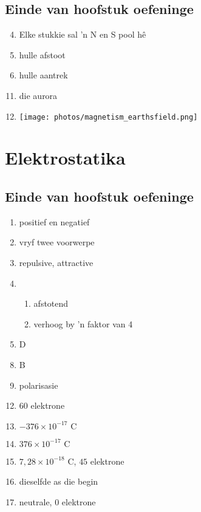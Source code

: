\subsection{Einde van hoofstuk oefeninge}
\begin{multicols}{2}
 \begin{enumerate}[noitemsep, label=\textbf{(\arabic*)} ]
\setcounter{enumi}{3}
\item Elke stukkie sal 'n N en S pool h\^{e} 
\item hulle afstoot
\item hulle aantrek
\end{enumerate}
 \begin{enumerate}[noitemsep, label=\textbf{(\arabic*)} ]
\setcounter{enumi}{10}
\item die aurora
\item \texttt{[image: photos/magnetism\_earthsfield.png]}
 \end{enumerate}
\end{multicols}

\section{Elektrostatika}
\subsection{Einde van hoofstuk oefeninge}
\begin{multicols}{3}
 \begin{enumerate}[noitemsep, label=\textbf{(\arabic*)} ]
\item positief en negatief
\item vryf twee voorwerpe
\item repulsive, attractive
\item 
 \begin{enumerate}[noitemsep, label=\textbf{(\alph*)} ]
\item afstotend
\item verhoog by 'n faktor van 4
 \end{enumerate}
\item D
 \end{enumerate}
\begin{enumerate}[noitemsep, label=\textbf{(\arabic*)} ]
\setcounter{enumi}{7}
 \item B
\item polarisasie
\end{enumerate}
\begin{enumerate}[noitemsep, label=\textbf{(\arabic*)} ]
\setcounter{enumi}{11}
 \item $60$ elektrone
\item $-376 \times 10^{-17} \text{ C}$
\item $376 \times 10^{-17} \text{ C}$
\item $7,28 \times 10^{-18} \text{ C}$, $45$ elektrone
\item dieselfde as die begin
\item neutrale, $0$ elektrone
\end{enumerate}
\end{multicols}

